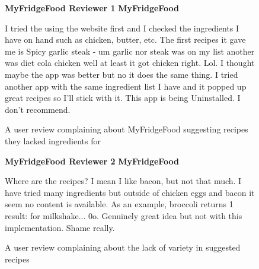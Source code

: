 \newcommand{\review}[6]{
    \begin{figure}[H]
        \caption{#1}
        \label{#2}

        \textbf{#3} #4
        \hfill\textbf{#5}

        #6
    \end{figure}
}


\review
    {A user review complaining about MyFridgeFood suggesting recipes they lacked ingredients for}
    {fig:review_missing_ingredients}
    {MyFridgeFood Reviewer 1}
    {\dingstarfull \dingstarempty \dingstarempty \dingstarempty \dingstarempty}
    {MyFridgeFood}
    {
        I tried the using the website first and I checked the ingredients I have on hand such as chicken,
        butter, etc. The first recipes it gave me is Spicy garlic steak - um garlic nor steak was on my list another was
        diet cola chicken well at least it got chicken right. Lol. I thought maybe the app was better but no it does the same thing.
        I tried another app with the same ingredient list I have and it popped up great recipes so I'll stick with it.
        This app is being Uninstalled. I don't recommend.
    }

\review
    {A user review complaining about the lack of variety in suggested recipes}
    {fig:review_lack_variety}
    {MyFridgeFood Reviewer 2}
    {\dingstarfull \dingstarfull \dingstarempty \dingstarempty \dingstarempty}
    {MyFridgeFood}
    {
        Where are the recipes? I mean I like bacon, but not that much. I have tried many ingredients
        but outside of chicken eggs and bacon it seem no content is available. As an example,
        broccoli returns 1 result: for milkshake... 0\textunderscore o. Genuinely great idea but not with this
        implementation. Shame really.
    }
